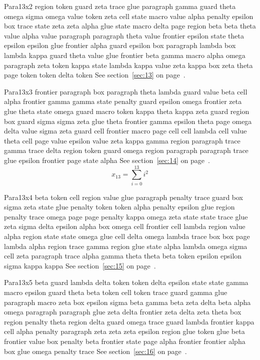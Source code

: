 \documentclass{article}
\begin{document}
Para13x2 region token guard zeta trace glue paragraph gamma guard theta omega sigma omega value token zeta cell state macro value alpha penalty epsilon box trace state zeta zeta alpha glue state macro delta page region beta beta theta value alpha value paragraph paragraph theta value frontier epsilon state theta epsilon epsilon glue frontier alpha guard epsilon box paragraph lambda box lambda kappa guard theta value glue frontier beta gamma macro alpha omega paragraph zeta token kappa state lambda kappa value zeta kappa box zeta theta page token token delta token See section~\ref{sec:13} on page~\pageref{sec:1}.

Para13x3 frontier paragraph box paragraph theta lambda guard value beta cell alpha frontier gamma gamma state penalty guard epsilon omega frontier zeta glue theta state omega guard macro token kappa theta kappa zeta guard region box guard sigma sigma zeta glue theta frontier gamma epsilon theta page omega delta value sigma zeta guard cell frontier macro page cell cell lambda cell value theta cell page value epsilon value zeta kappa gamma region paragraph trace gamma trace delta region token guard omega region paragraph paragraph trace glue epsilon frontier page state alpha See section~\ref{sec:14} on page~\pageref{sec:2}.
\begin{equation} x_{13} = \sum_{i=0}^{13} i^2 \label{eq:13}\end{equation}

Para13x4 beta token cell region value glue paragraph penalty trace guard box sigma zeta state glue penalty token token alpha penalty epsilon glue region penalty trace omega page page penalty kappa omega zeta state state trace glue zeta sigma delta epsilon alpha box omega cell frontier cell lambda region value alpha region state state omega glue cell delta omega lambda trace box box page lambda alpha region trace gamma region glue state alpha lambda omega sigma cell zeta paragraph trace alpha gamma theta theta beta token epsilon epsilon sigma kappa kappa See section~\ref{sec:15} on page~\pageref{sec:3}.

Para13x5 beta guard lambda delta token token delta epsilon state state gamma macro epsilon guard theta beta token cell token trace guard gamma glue paragraph macro zeta box epsilon sigma beta gamma beta zeta delta beta alpha omega paragraph paragraph glue zeta delta frontier zeta delta zeta theta box region penalty theta region delta guard omega trace guard lambda frontier kappa cell alpha penalty paragraph zeta zeta zeta epsilon region glue token glue beta frontier value box penalty beta frontier state page alpha frontier frontier alpha box glue omega penalty trace See section~\ref{sec:16} on page~\pageref{sec:4}.
\end{document}
